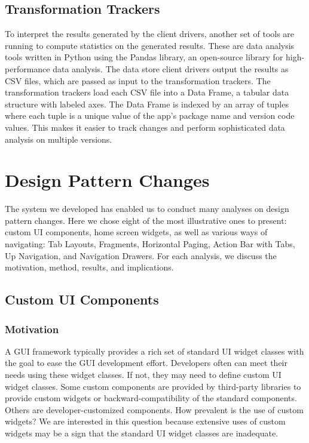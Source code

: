 \subsection{Transformation Trackers}

To interpret the results generated by the client drivers, another set of tools are running to compute statistics on the generated results.
These are data analysis tools written in Python using the Pandas library, an open-source library for high-performance data analysis.
The data store client drivers output the results as CSV files, which are passed as input to the transformation trackers.
The transformation trackers load each CSV file into a Data Frame, a tabular data structure with labeled axes.
The Data Frame is indexed by an array of tuples where each tuple is a unique value of the app's package name and version code values.
This makes it easier to track changes and perform sophisticated data analysis on multiple versions.

\section{Design Pattern Changes}
The system we developed has enabled us to conduct many analyses on design pattern changes.
Here we chose eight of the most illustrative ones to present: custom UI components, home screen widgets, as well as various ways of navigating: Tab Layouts, Fragments, Horizontal Paging, Action Bar with Tabs, Up Navigation, and Navigation Drawers. 
For each analysis, we discuss the motivation, method, results, and implications.

\subsection{Custom UI Components}

\subsubsection{Motivation}

A GUI framework typically provides a rich set of standard UI widget classes with the goal to ease the GUI development effort.
Developers often can meet their needs using these widget classes. 
If not, they may need to define custom UI widget classes. 
Some custom components are provided by third-party libraries to provide custom widgets or backward-compatibility of the standard components. 
Others are developer-customized components. 
How prevalent is the use of custom widgets? We are interested in this question because extensive uses of custom widgets may be a sign that the standard UI widget classes are inadequate.
